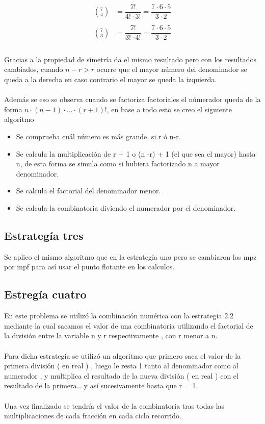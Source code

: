 \documentclass[12pt,letterpaper]{scrartcl}
\begin{document}
\[\begin{matrix}
{7 \choose 4}  &= \dfrac{7!}{4! \cdot 3!} = \dfrac{7 \cdot 6 \cdot 5}{3 \cdot 2}\\ 
 &\\
{7 \choose 3}  &= \dfrac{7!}{3!\cdot4!} = \dfrac{7 \cdot 6 \cdot 5}{3 \cdot 2 }\\
\end{matrix}
\]
\\
Gracias a la propiedad de simetría da el mismo resultado pero con los resultados cambiados, cuando $n-r > r$ ocurre que el mayor número del denominador se queda a la derecha en caso contrario el mayor se queda la izquierda.
\\\\
Además se eso se observa cuando se factoriza factoriales el númerador queda de la forma $n \cdot (n-1) \cdot \ldots \cdot (r+1)!$, en base a todo esto se creo el siguiente algoritmo

\begin{itemize}
\item Se comprueba cuál número es más grande, si r ó n-r.


\item Se calcula la multiplicación de r + 1 o (n -r) + 1 (el que sea el mayor) hasta n, de esta forma se simula como si hubiera factorizado n a mayor denominador.

\item Se calcula el factorial del denominador menor.

\item Se calcula la combinatoria diviendo el numerador por el denominador.

\end{itemize}




\subsection{Estrategía tres}

Se aplico el mismo algoritmo que en la estrategía uno pero se cambiaron los mpz por mpf para así usar el punto flotante en los calculos.


\subsection{Estregía cuatro}


En este problema se utilizó la combinación numérica con la estrategia 2.2 mediante la cual sacamos el valor de una combinatoria utilizando el factorial de la división entre la variable n y r respectivamente , con r menor a n.
\\\\
Para dicha estrategia se utilizó un algoritmo que primero saca el valor de la primera división ( en real ) , luego le resta 1 tanto al denominador como al numerador , y multiplica el resultado de la nueva división ( en real ) con el resultado de la primera… y así sucesivamente hasta que r = 1.
\\\\
Una vez finalizado se tendría el valor de la combinatoria tras todas las multiplicaciones de cada fracción en cada ciclo recorrido.
\\\\
\end{document}
